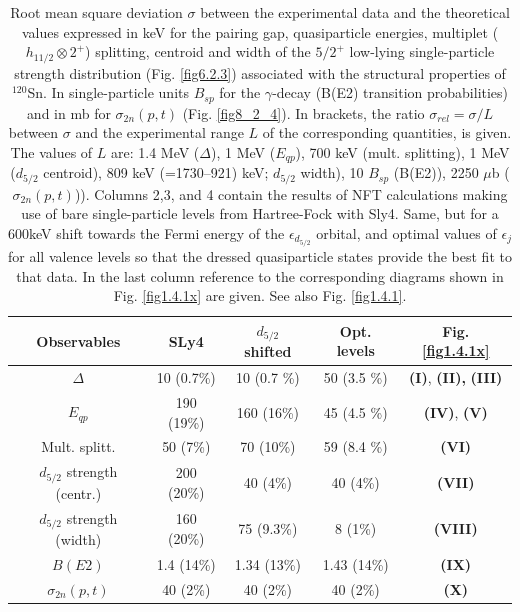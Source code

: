 \begin{table}
	\begin{center}
		\begin{tabular}{|c|c|c|c|c|}
			\hline
			Observables  &  SLy4 &  $d_{5/2}$ shifted  & Opt. levels& Fig. \ref{fig1.4.1x} \\ 
			\hline
			$\Delta$ &  10  (0.7\%) &  10  (0.7 \%) & 50   (3.5 \%)&\textbf{(I)}, \textbf{(II),} \textbf{(III)}\\
			$E_{qp}$ & 190 (19\%)  & 160  (16\%)   & 45  (4.5 \%)& \textbf{(IV)}, \textbf{(V)}\\
			Mult.  splitt. & 50  (7\%) & 70  (10\%)    & 59  (8.4 \%)& \textbf{(VI)}\\
			$d_{5/2}$ strength (centr.) & 200  (20\%)  & 40  (4\%)   & 40  (4\%)& \textbf{(VII)} \\
			$d_{5/2}$ strength (width) & 160  (20\%)  &75  (9.3\%)  &  8  (1\%)& \textbf{(VIII)}\\
			$B(E2)$ & 1.4  (14\%) & 1.34  (13\%)   & 1.43  (14\%)& \textbf{(IX)}\\ 
			$\sigma_{2n}(p,t)$ & 40 (2\%) & 40 (2\%) & 40 (2\%) &\textbf{(X)}\\
			\hline
		\end{tabular}
		\caption{ Root  mean square deviation $\sigma$ between  the experimental data and the theoretical values expressed in keV for the pairing gap, quasiparticle energies, multiplet ($h_{11/2}\otimes 2^+$) splitting, centroid and width of the  
			$5/2^+$ low-lying single-particle strength distribution (Fig. \ref{fig6.2.3}) associated with the structural properties of $^{120}$Sn. In single-particle units $B_{sp}$ for the $\gamma$-decay  (B(E2) transition probabilities) and in mb for $\sigma_{2n}(p,t)$ (Fig. \ref{fig8_2_4}). In brackets, 
			the ratio $\sigma_{rel}=\sigma/L$ between $\sigma$ and the experimental  range $L$ of the corresponding quantities, is given. The values of $L$ are: 1.4 MeV ($\Delta$), 1 MeV ($E_{qp}$), 700 keV (mult. splitting), 
			1 MeV ($d_{5/2}$ centroid),  809 keV (=1730--921) keV;  $d_{5/2}$ width), 10 $B_{sp}$ (B(E2)), 2250 $\mu$b ($\sigma_{2n}(p,t)$)). Columns 2,3, and 4 contain the results of NFT calculations making use of bare single-particle levels from Hartree-Fock with Sly4.  Same, but for a 600keV shift towards the Fermi energy of the $\epsilon_{d_{5/2}}$ orbital, and optimal values of $\epsilon_j$ for all valence levels so that the dressed quasiparticle states provide the best fit to that data. In the last column reference to the corresponding diagrams shown in Fig. \ref{fig1.4.1x} are given. See also Fig. \ref{fig1.4.1}.}
		\label{tab1.4.1}
	\end{center}
\end{table}


